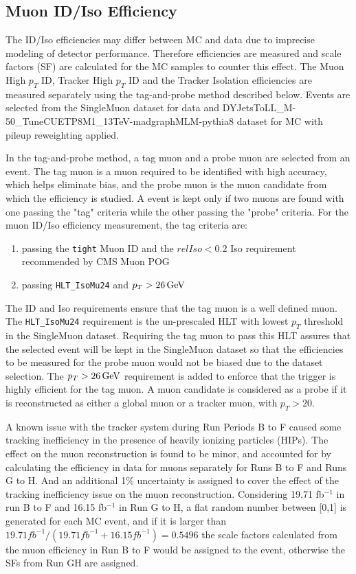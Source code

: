 \subsection{Muon ID/Iso Efficiency}
The ID/Iso efficiencies may differ between MC and data due to imprecise modeling of detector performance. Therefore efficiencies are measured and scale factors (SF) are calculated for the MC samples to counter this effect. The Muon High $p_T$ ID, Tracker High $p_T$ ID and the Tracker Isolation efficiencies are measured separately using the tag-and-probe method described below. Events are selected from the SingleMuon dataset for data and DYJetsToLL\_M-50\_TuneCUETP8M1\_13TeV-madgraphMLM-pythia8 dataset for MC with pileup reweighting applied. 

\vspace{0.3cm}
In the tag-and-probe method, a tag muon and a probe muon are selected from an event. The tag muon is a muon required to be identified with high accuracy, which helps eliminate bias, and the probe muon is the muon candidate from which the efficiency is studied. A event is kept only if two muons are found with one passing the "tag" criteria while the other passing the "probe" criteria. For the muon ID/Iso efficiency measurement, the tag criteria are:
\begin{enumerate}
\item passing the \texttt{tight} Muon ID and the $relIso<0.2$ Iso requirement recommended by CMS Muon POG
\item passing \texttt{HLT\_IsoMu24} and $p_T > 26\,\text{Ge\hspace{-.08em}V}$
\end{enumerate}

The ID and Iso requirements ensure that the tag muon is a well defined muon. The \texttt{HLT\_IsoMu24} requirement is the un-prescaled HLT with lowest $p_T$ threshold in the SingleMuon dataset. Requiring the tag muon to pass this HLT assures that the selected event will be kept in the SingleMuon dataset so that the efficiencies to be measured for the probe muon would not be biased due to the dataset selection. The $p_T > 26\,\text{Ge\hspace{-.08em}V}$ requirement is added to enforce that the trigger is highly efficient for the tag muon. A muon candidate is considered as a probe if it is reconstructed as either a global muon or a tracker muon, with $p_T > 20$\GeV.

\vspace{0.3cm}
A known issue with the tracker system during Run Periods B to F caused some tracking inefficiency in the presence of heavily ionizing particles (HIPs). The effect on the muon reconstruction is found to be minor, and accounted for by calculating the efficiency in data for muons separately for Runs B to F and Runs G to H. And an additional 1\% uncertainty is assigned to cover the effect of the tracking inefficiency issue on the muon reconstruction. Considering 19.71 fb$^{-1}$ in run B to F and 16.15 fb$^{-1}$ in Run G to H, a flat random number between [0,1] is generated for each MC event, and if it is larger than $19.71 fb^{-1}/(19.71 fb^{-1}+16.15 fb^{-1})=0.5496$ the scale factors calculated from the muon efficiency in Run B to F would be assigned to the event, otherwise the SFs from Run GH are assigned.

